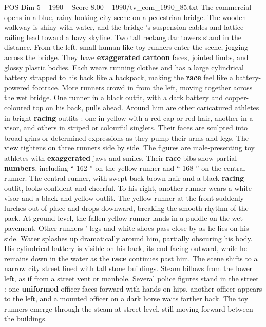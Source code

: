 \begin{textsample}{POS Dim 5 – 1990 – Score 8.00 – 1990/tv\_com\_1990\_85.txt}  \label{ex:f5_pos_016}
The commercial opens in a blue, rainy-looking city scene on a pedestrian bridge.
The wooden walkway is shiny with water, and the bridge ’s suspension cables and lattice railing lead toward a hazy skyline.
Two tall rectangular towers stand in the distance.
From the left, small human-like toy runners enter the scene, jogging across the bridge.
They have \textbf{exaggerated} \textbf{cartoon} faces, jointed limbs, and glossy plastic bodies.
Each wears running clothes and has a large cylindrical battery strapped to his back like a backpack, making the \textbf{race} feel like a battery-powered footrace.
More runners crowd in from the left, moving together across the wet bridge.
One runner in a black outfit, with a dark battery and copper-coloured top on his back, pulls ahead.
Around him are other caricatured athletes in bright \textbf{racing} outfits : one in yellow with a red cap or red hair, another in a visor, and others in striped or colourful singlets.
Their faces are sculpted into broad grins or determined expressions as they pump their arms and legs.
The view tightens on three runners side by side.
The figures are male-presenting toy athletes with \textbf{exaggerated} jaws and smiles.
Their \textbf{race} bibs show partial \textbf{numbers}, including “ 162 ” on the yellow runner and “ 168 ” on the central runner.
The central runner, with swept-back brown hair and a black \textbf{racing} outfit, looks confident and cheerful.
To his right, another runner wears a white visor and a black-and-yellow outfit.
The yellow runner at the front suddenly lurches out of place and drops downward, breaking the smooth rhythm of the pack.
At ground level, the fallen yellow runner lands in a puddle on the wet pavement.
Other runners ’ legs and white shoes pass close by as he lies on his side.
Water splashes up dramatically around him, partially obscuring his body.
His cylindrical battery is visible on his back, its end facing outward, while he remains down in the water as the \textbf{race} continues past him.
The scene shifts to a narrow city street lined with tall stone buildings.
Steam billows from the lower left, as if from a street vent or manhole.
Several police figures stand in the street : one \textbf{uniformed} officer faces forward with hands on hips, another officer appears to the left, and a mounted officer on a dark horse waits farther back.
The toy runners emerge through the steam at street level, still moving forward between the buildings.

\end{textsample}
